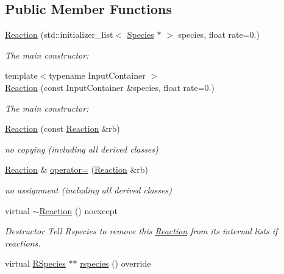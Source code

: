 \subsection*{Public Member Functions}
\begin{DoxyCompactItemize}
\item 
\hyperlink{classchem_1_1Reaction_af8d2b07836a89ba05c3ba42ff1e1672e}{Reaction} (std\-::initializer\-\_\-list$<$ \hyperlink{classchem_1_1Species}{Species} $\ast$ $>$ species, float rate=0.)
\begin{DoxyCompactList}\small\item\em The main constructor\-: \end{DoxyCompactList}\item 
{\footnotesize template$<$typename Input\-Container $>$ }\\\hyperlink{classchem_1_1Reaction_a267e22a2712987cd6f700f88a841f1ff}{Reaction} (const Input\-Container \&species, float rate=0.)
\begin{DoxyCompactList}\small\item\em The main constructor\-: \end{DoxyCompactList}\item 
\hyperlink{classchem_1_1Reaction_a3da1e806c18d90f6f89b1ea2d469c172}{Reaction} (const \hyperlink{classchem_1_1Reaction}{Reaction} \&rb)
\begin{DoxyCompactList}\small\item\em no copying (including all derived classes) \end{DoxyCompactList}\item 
\hyperlink{classchem_1_1Reaction}{Reaction} \& \hyperlink{classchem_1_1Reaction_aea2276bdc0b66f5c3d3f890e894de8f9}{operator=} (\hyperlink{classchem_1_1Reaction}{Reaction} \&rb)
\begin{DoxyCompactList}\small\item\em no assignment (including all derived classes) \end{DoxyCompactList}\item 
virtual \hyperlink{classchem_1_1Reaction_a49e439ac62592b6c9bba5ec9ca6a8825}{$\sim$\-Reaction} () noexcept
\begin{DoxyCompactList}\small\item\em Destructor Tell Rspecies to remove this \hyperlink{classchem_1_1Reaction}{Reaction} from its internal lists if reactions. \end{DoxyCompactList}\item 
virtual \hyperlink{classchem_1_1RSpecies}{R\-Species} $\ast$$\ast$ \hyperlink{classchem_1_1Reaction_a541ddbcb6988934f4fba5e16f7520bec}{rspecies} () override
$$
\end{DoxyCompactItemize}
